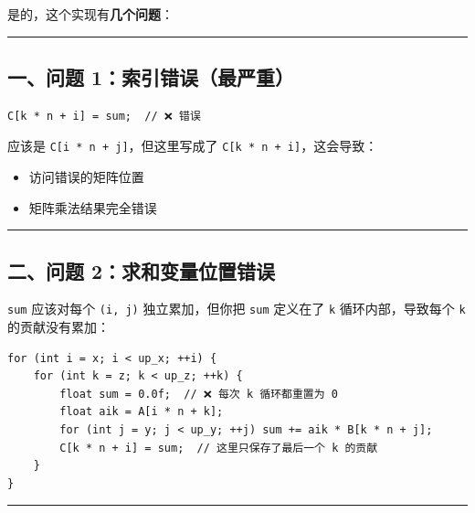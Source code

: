 \documentclass[11pt, a4paper]{article}
\begin{document}
\begin{aibox}
是的，这个实现有\textbf{几个问题}：

\begin{center}\rule{\textwidth}{0.4pt}\end{center}

\subsection*{一、问题 1：索引错误（最严重）}

\begin{tcolorbox}[colback=white,colframe=gray!50!white,boxrule=0.5pt,arc=2pt,left=5pt,right=5pt,top=5pt,bottom=5pt]
\begin{verbatim}
C[k * n + i] = sum;  // ❌ 错误
\end{verbatim}
\end{tcolorbox}

应该是 \texttt{C[i * n + j]}，但这里写成了 \texttt{C[k * n + i]}，这会导致：
\begin{itemize}
    \item 访问错误的矩阵位置
    \item 矩阵乘法结果完全错误
\end{itemize}

\begin{center}\rule{\textwidth}{0.4pt}\end{center}

\subsection*{二、问题 2：求和变量位置错误}

\texttt{sum} 应该对每个 \texttt{(i, j)} 独立累加，但你把 \texttt{sum} 定义在了 \texttt{k} 循环内部，导致每个 \texttt{k} 的贡献没有累加：

\begin{tcolorbox}[colback=white,colframe=gray!50!white,boxrule=0.5pt,arc=2pt,left=5pt,right=5pt,top=5pt,bottom=5pt]
\begin{verbatim}
for (int i = x; i < up_x; ++i) {
    for (int k = z; k < up_z; ++k) {
        float sum = 0.0f;  // ❌ 每次 k 循环都重置为 0
        float aik = A[i * n + k];
        for (int j = y; j < up_y; ++j) sum += aik * B[k * n + j];
        C[k * n + i] = sum;  // 这里只保存了最后一个 k 的贡献
    }
}
\end{verbatim}
\end{tcolorbox}

\begin{center}\rule{\textwidth}{0.4pt}\end{center}


\end{aibox}
\end{document}
